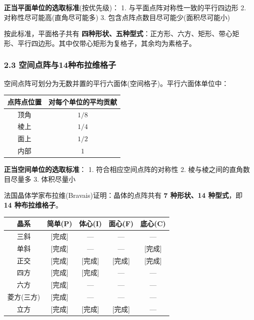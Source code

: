 \textbf{正当平面单位的选取标准}(按优先级)：
1. 与平面点阵对称性一致的平行四边形
2. 对称性尽可能高(直角尽可能多)
3. 包含点阵点数目尽可能少(面积尽可能小)

按此标准，平面格子共有 \textbf{四种形状、五种型式}：正方形、六方、矩形、带心矩形、平行四边形。其中仅带心矩形为复格子，其余均为素格子。

\subsubsection{2.3 空间点阵与14种布拉维格子}\label{ux7a7aux95f4ux70b9ux9635ux4e0e14ux79cdux5e03ux62c9ux7ef4ux683cux5b50}

空间点阵可划分为无数并置的平行六面体(空间格子)。平行六面体单位中：

{\def\LTcaptype{none} %
\begin{longtable}[]{@{}cc@{}}
\toprule\noalign{}
点阵点位置 & 对每个单位的平均贡献 \\
\midrule\noalign{}
\endhead
\bottomrule\noalign{}
\endlastfoot
顶角 & \(1/8\) \\
棱上 & \(1/4\) \\
面上 & \(1/2\) \\
内部 & \(1\) \\
\end{longtable}
}

\textbf{正当空间单位的选取标准}：
1. 符合相应空间点阵的对称性
2. 棱与棱之间的直角数目尽量多
3. 体积尽量小

法国晶体学家布拉维(Bravais)证明：晶体的点阵共有 \textbf{7 种形状、14 种型式}，即 \textbf{14 种布拉维格子}。

{\def\LTcaptype{none} %
\begin{longtable}[]{@{}ccccc@{}}
\toprule\noalign{}
晶系 & 简单(P) & 体心(I) & 面心(F) & 底心(C) \\
\midrule\noalign{}
\endhead
\bottomrule\noalign{}
\endlastfoot
三斜 & {[}完成{]} & --- & --- & --- \\
单斜 & {[}完成{]} & --- & --- & {[}完成{]} \\
正交 & {[}完成{]} & {[}完成{]} & {[}完成{]} & {[}完成{]} \\
四方 & {[}完成{]} & {[}完成{]} & --- & --- \\
六方 & {[}完成{]} & --- & --- & --- \\
菱方(三方) & {[}完成{]} & --- & --- & --- \\
立方 & {[}完成{]} & {[}完成{]} & {[}完成{]} & --- \\
\end{longtable}
}


